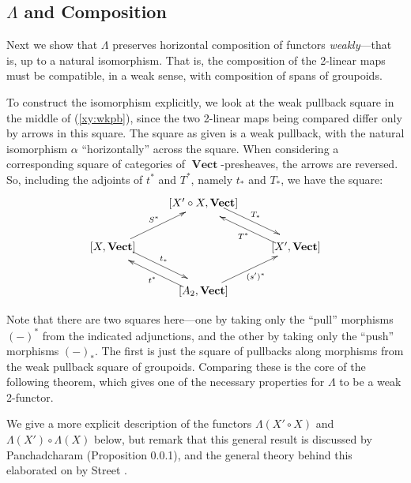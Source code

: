 \documentclass[10pt]{amsart}
\numberwithin{theorem}{subsection}
\newcommand{\opname}[1]{\operatorname{#1}}
\newcommand{\catname}[1]{\boldsymbol{\opname{{#1}}}}
\newcommand{\V}{\catname{Vect}}
\newcommand{\HV}[1]{[#1,\V]}
\newcommand{\FV}{\Lambda}
\begin{document}
\subsection{$\FV$ and Composition}

Next we show that $\FV$ preserves horizontal composition of functors
\textit{weakly}---that is, up to a natural isomorphism.  That is, the
composition of the 2-linear maps must be compatible, in a weak sense,
with composition of spans of groupoids.  

To construct the isomorphism explicitly, we look at the weak pullback square in the middle of
(\ref{xy:wkpb}), since the two 2-linear maps being compared
differ only by arrows in this square.  The square as given is a weak
pullback, with the natural isomorphism $\alpha$ ``horizontally''
across the square.  When considering a corresponding square of
categories of $\V$-presheaves, the arrows are reversed.  So, including
the adjoints of $t^{\ast}$ and $T^{\ast}$, namely
$t_{\ast}$ and $T_{\ast}$, we have the square:
\begin{equation}\label{eq:adjunctionmatesquare}
\xymatrix{
   & \HV{X'\circ X} \ar@<1ex>^{T_{\ast}}[rd] & \\
   \HV{X} \ar^{S^{\ast}}[ur] \ar@<1ex>^{t_{\ast}}[rd] & & \HV{X'} \ar@<1ex>^{T^{\ast}}[ul] \\
   & \HV{A_2} \ar_{(s')^{\ast}}[ur] \ar@<1ex>^{t^{\ast}}[ul] &
} \end{equation}

Note that there are two squares here---one by taking only the ``pull''
morphisms $(-)^{\ast}$ from the indicated adjunctions, and the other
by taking only the ``push'' morphisms $(-)_{\ast}$.  The first is just
the square of pullbacks along morphisms from the weak pullback square
of groupoids.  Comparing these is the core of the following
theorem, which gives one of the necessary properties for $\FV$ to be a
weak 2-functor.

We give a more explicit description of the functors $\FV(X' \circ X)$
and $\FV(X') \circ \FV(X)$ below, but remark that this general result
is discussed by Panchadcharam \cite{elango} (Proposition 0.0.1), and
the general theory behind this elaborated on by Street \cite{street2}.
\end{document}
